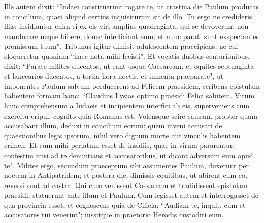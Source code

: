 \begin{biblechapter}
\verse Ille autem dixit: “Iudaei constituerunt rogare te, ut crastina die Paulum producas in concilium, quasi aliquid certius inquisiturum sit de illo. 
\verse Tu ergo ne credideris illis; insidiantur enim ei ex eis viri amplius quadraginta, qui se devoverunt non manducare neque bibere, donec interficiant eum; et nunc parati sunt exspectantes promissum tuum". 
\verse Tribunus igitur dimisit adulescentem praecipiens, ne cui eloqueretur quoniam “haec nota mihi fecisti". 
\verse Et vocatis duobus centurionibus, dixit: “Parate milites ducentos, ut eant usque Caesaream, et equites septuaginta et lancearios ducentos, a tertia hora noctis, 
\verse et iumenta praeparate", ut imponentes Paulum salvum perducerent ad Felicem praesidem, 
\verse scribens epistulam habentem formam hanc: 
\verse “Claudius Lysias optimo praesidi Felici salutem. 
\verse Virum hunc comprehensum a Iudaeis et incipientem interfici ab eis, superveniens cum exercitu eripui, cognito quia Romanus est. 
\verse Volensque scire causam, propter quam accusabant illum, deduxi in concilium eorum; 
\verse quem inveni accusari de quaestionibus legis ipsorum, nihil vero dignum morte aut vinculis habentem crimen. 
\verse Et cum mihi perlatum esset de insidiis, quae in virum pararentur, confestim misi ad te denuntians et accusatoribus, ut dicant adversum eum apud te". 
\verse Milites ergo, secundum praeceptum sibi assumentes Paulum, duxerunt per noctem in Antipatridem; 
\verse et postera die, dimissis equitibus, ut abirent cum eo, reversi sunt ad castra. 
\verse Qui cum venissent Caesaream et tradidissent epistulam praesidi, statuerunt ante illum et Paulum. 
\verse Cum legisset autem et interrogasset de qua provincia esset, et cognoscens quia de Cilicia: 
\verse “Audiam te, inquit, cum et accusatores tui venerint"; iussitque in praetorio Herodis custodiri eum. 
\end{biblechapter}

